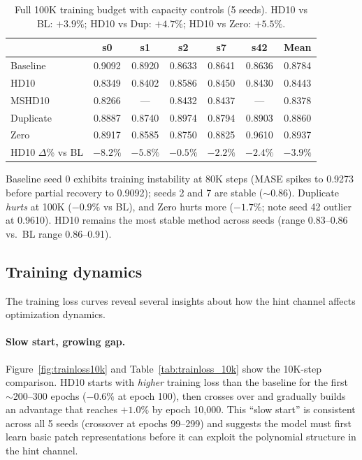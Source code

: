 \documentclass[11pt]{article}
\begin{document}
\begin{table}[h]
\centering
\caption{Full 100K training budget with capacity controls (5 seeds). HD10 vs BL: $+3.9\%$; HD10 vs Dup: $+4.7\%$; HD10 vs Zero: $+5.5\%$.}
\small
\begin{tabular}{lcccccc}
\toprule
& \textbf{s0} & \textbf{s1} & \textbf{s2} & \textbf{s7} & \textbf{s42} & \textbf{Mean} \\
\midrule
Baseline & 0.9092 & 0.8920 & 0.8633 & 0.8641 & 0.8636 & 0.8784 \\
HD10 & 0.8349 & 0.8402 & 0.8586 & 0.8450 & 0.8430 & 0.8443 \\
MSHD10 & 0.8266 & --- & 0.8432 & 0.8437 & --- & 0.8378 \\
Duplicate & 0.8887 & 0.8740 & 0.8974 & 0.8794 & 0.8903 & 0.8860 \\
Zero & 0.8917 & 0.8585 & 0.8750 & 0.8825 & 0.9610 & 0.8937 \\
\midrule
HD10 $\Delta$\% vs BL & $-8.2\%$ & $-5.8\%$ & $-0.5\%$ & $-2.2\%$ & $-2.4\%$ & $-3.9\%$ \\
\bottomrule
\end{tabular}
\end{table}

Baseline seed 0 exhibits training instability at 80K steps (MASE spikes to 0.9273 before partial recovery to 0.9092); seeds 2 and 7 are stable ($\sim$0.86). Duplicate \emph{hurts} at 100K ($-0.9\%$ vs BL), and Zero hurts more ($-1.7\%$; note seed 42 outlier at 0.9610). HD10 remains the most stable method across seeds (range 0.83--0.86 vs.\ BL range 0.86--0.91).

\subsection{Training dynamics}

The training loss curves reveal several insights about how the hint channel affects optimization dynamics.

\paragraph{Slow start, growing gap.} Figure~\ref{fig:trainloss10k} and Table~\ref{tab:trainloss_10k} show the 10K-step comparison. HD10 starts with \emph{higher} training loss than the baseline for the first $\sim$200--300 epochs ($-0.6\%$ at epoch 100), then crosses over and gradually builds an advantage that reaches $+1.0\%$ by epoch 10,000. This ``slow start'' is consistent across all 5 seeds (crossover at epochs 99--299) and suggests the model must first learn basic patch representations before it can exploit the polynomial structure in the hint channel.
\end{document}
